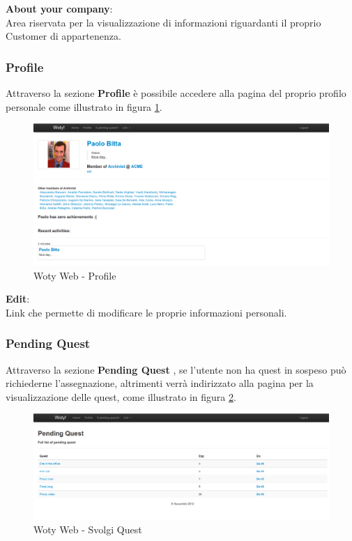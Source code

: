 \textbf{About your company}:\\
Area riservata per la visualizzazione di informazioni riguardanti il proprio Customer di appartenenza. 




\subsubsection{Profile}
Attraverso la sezione \textbf{Profile} è possibile accedere alla pagina del proprio profilo personale come illustrato in figura \ref{ww-profile}.


\begin{center}
\begin{figure}[H]
\centering
\includegraphics[scale=0.35]{images/wotyWeb/profile.png}
\caption{Woty Web - Profile}
\label{ww-profile}
\end{figure}
\end{center}

\textbf{Edit}:\\
Link che permette di modificare le proprie informazioni personali.\\






\subsubsection{Pending Quest}
Attraverso la sezione \textbf{ Pending Quest }, se l'utente non ha quest in sospeso può richiederne l'assegnazione, altrimenti verrà indirizzato alla pagina per la visualizzazione delle quest, come illustrato in figura \ref{ww-doQuest}.


\begin{center}
\begin{figure}[H]
\centering
\includegraphics[scale=0.35]{images/wotyWeb/doQuest.png}
\caption{Woty Web - Svolgi Quest}
\label{ww-doQuest}
\end{figure}
\end{center}



